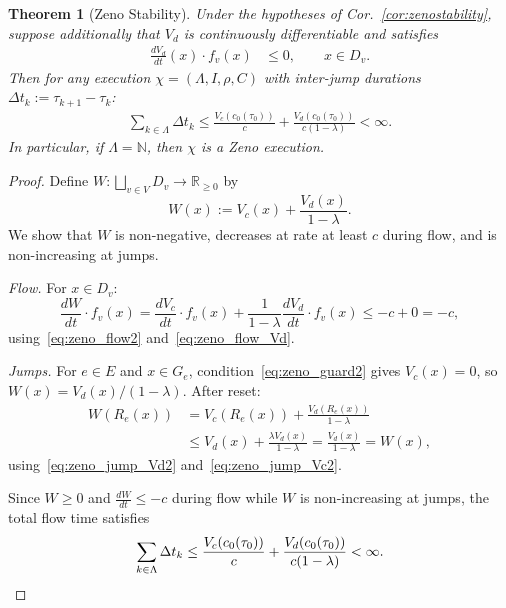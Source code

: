 \documentclass[letterpaper, 10 pt, conference]{IEEEconf}
\newtheorem{thm}{Theorem}
\theoremstyle{definition}
\newcommand{\maps}{\colon}
\newcommand{\N}{\mathbb N}
\newcommand{\R}{\mathbb R}
\begin{document}
\begin{thm}[Zeno Stability]\label{thm:ZenoStability}
    Under the hypotheses of Cor.~\ref{cor:zenostability}, suppose additionally that $V_d$ is continuously differentiable and satisfies
    \begin{align}
        \frac{dV_d}{dt}(x) \cdot f_v(x) &\leq 0, \qquad x \in D_v. \label{eq:zeno_flow_Vd}
    \end{align}
    Then for any execution $\chi = (\Lambda, I, \rho, C)$ with inter-jump durations $\Delta t_k := \tau_{k+1} - \tau_k$:
    \begin{align}
        \sum_{k \in \Lambda} \Delta t_k \leq \frac{V_c(c_0(\tau_0))}{c} + \frac{V_d(c_0(\tau_0))}{c(1 - \lambda)} < \infty. \label{eq:zenobound}
    \end{align}
    In particular, if $\Lambda = \N$, then $\chi$ is a Zeno execution.
\end{thm}
\begin{proof}
    Define $W \maps \bigsqcup_{v \in V} D_v \to \R_{\geq 0}$ by
    \[
        W(x) := V_c(x) + \frac{V_d(x)}{1 - \lambda}.
    \]
    We show that $W$ is non-negative, decreases at rate at least $c$ during flow, and is non-increasing at jumps.

    \textit{Flow.} For $x \in D_v$:
    \[
        \frac{dW}{dt} \cdot f_v(x) = \frac{dV_c}{dt} \cdot f_v(x) + \frac{1}{1-\lambda}\frac{dV_d}{dt} \cdot f_v(x) \leq -c + 0 = -c,
    \]
    using~\eqref{eq:zeno_flow2} and~\eqref{eq:zeno_flow_Vd}.

    \textit{Jumps.} For $e \in E$ and $x \in G_e$, condition~\eqref{eq:zeno_guard2} gives $V_c(x) = 0$, so $W(x) = V_d(x)/(1 - \lambda)$. After reset:
    \begin{align*}
        W(R_e(x)) 
        &= V_c(R_e(x)) + \frac{V_d(R_e(x))}{1-\lambda} 
        \\&\leq V_d(x) + \frac{\lambda V_d(x)}{1-\lambda} = \frac{V_d(x)}{1-\lambda} = W(x),
    \end{align*}
    using~\eqref{eq:zeno_jump_Vd2} and~\eqref{eq:zeno_jump_Vc2}.

    Since $W \geq 0$ and $\frac{dW}{dt} \leq -c$ during flow while $W$ is non-increasing at jumps, the total flow time satisfies
    \[
        \sum_{k \in \Lambda} \Delta t_k 
        \leq 
        \frac{V_c(c_0(\tau_0))}{c} + \frac{V_d(c_0(\tau_0))}{c(1 - \lambda)} < \infty. \qedhere
    \]
\end{proof}

\end{document}
